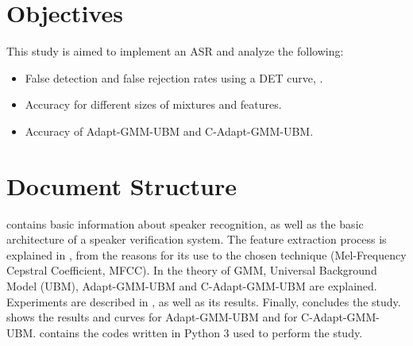 \section{Objectives}

This study is aimed to implement an ASR and analyze the following:

\begin{itemize}\itemsep0pt
    \item False detection and false rejection rates using a DET curve, .
    \item Accuracy for different sizes of mixtures and features.
    \item Accuracy of Adapt-GMM-UBM and C-Adapt-GMM-UBM.
\end{itemize}

\section{Document Structure}

 contains basic information about speaker recognition, as well as the basic architecture of a speaker verification system. The feature extraction process is explained in , from the reasons for its use to the chosen technique (Mel-Frequency Cepstral Coefficient, MFCC). In  the theory of GMM, Universal Background Model (UBM), Adapt-GMM-UBM and C-Adapt-GMM-UBM are explained. Experiments are described in , as well as its results. Finally,  concludes the study.  shows the results and curves for Adapt-GMM-UBM and  for C-Adapt-GMM-UBM.  contains the codes written in Python 3 used to perform the study.